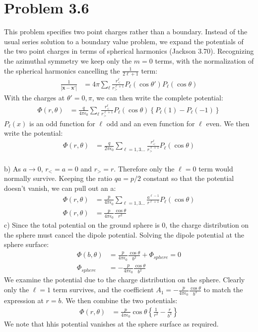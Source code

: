 \documentclass[a4paper,11pt]{article}
\numberwithin{equation}{section}
\newcommand{\bvp}[1]{\mathbf{#1}'}
\newcommand{\bv}[1]{\mathbf{#1}}
\newcommand{\ez}{\epsilon_0}
\newcommand{\lrb}[1]{\left\{{#1}\right\}}
\begin{document}
\section{Problem 3.6}
This problem specifies two point charges rather than a boundary. 
Instead of the usual series solution to a boundary value problem, we expand the potentials of the two point charges in terms of spherical harmonics (Jackson 3.70).
Recognizing the azimuthal symmetry we keep only the $m=0$ terms, with the normalization of the spherical harmonics cancelling the $\frac{1}{2\ell+1}$ term:
\begin{align}
 \frac{1}{|\bv{x}-\bvp{x}|} &= 4\pi \sum_\ell \frac{r_<^\ell}{r_>^{\ell+1}}P_\ell(\cos\theta')P_\ell(\cos\theta)
\end{align}
With the charges at $\theta'=0,\pi$, we can then write the complete potential:
\begin{align}
 \Phi(r,\theta) &= \frac{q}{4\pi\ez}\sum_\ell \frac{r_<^\ell}{r_>^{\ell+1}} P_\ell(\cos\theta)\lrb{P_\ell(1)-P_\ell(-1)}
\end{align}
$P_\ell(x)$ is an odd function for $\ell$ odd and an even function for $\ell$ even. 
We then write the potential:
\begin{align}
 \Phi(r,\theta) &= \frac{q}{2\pi\ez}\sum_{\ell=1,3...} \frac{r_<^\ell}{r_>^{\ell+1}} P_\ell(\cos\theta)
\end{align}
\\
b) As $a\rightarrow 0$, $r_<=a=0$ and $r_>=r$. Therefore only the $\ell=0$ term would normally survive.
Keeping the ratio $qa=p/2$ constant so that the potential doesn't vanish, we can pull out an a:
\begin{align}
 \Phi(r,\theta) &= \frac{p}{4\pi\ez} \sum_{\ell=1,3...} \frac{a^{\ell-1}}{r^{\ell+1}} P_\ell(\cos\theta)\\
 \Phi(r,\theta) &= \frac{p}{4\pi\ez} \frac{\cos\theta}{r^2}
\end{align}
c) Since the total potential on the ground sphere is 0, the charge distribution on the sphere must cancel the dipole potential.
Solving the dipole potential at the sphere surface:
\begin{align}
 \Phi(b,\theta) &= \frac{p}{4\pi\ez} \frac{\cos\theta}{b^2} + \Phi_{sphere} = 0\\
 \Phi_{sphere} &= -\frac{p}{4\pi\ez} \frac{\cos\theta}{b^2} 
\end{align}
We examine the potential due to the charge distribution on the sphere.
Clearly only the $\ell=1$ term survives, and the coefficient $A_1=-\frac{p}{4\pi\ez} \frac{\cos\theta}{b^3}$ to match the expression at $r=b$. 
We then combine the two potentials:
\begin{align}
 \Phi(r,\theta) &= \frac{p}{4\pi\ez}\cos\theta\lrb{\frac{1}{r^2}-\frac{r}{b^3}} 
\end{align}
We note that hhis potential vanishes at the sphere surface as required.
\\
\end{document}
